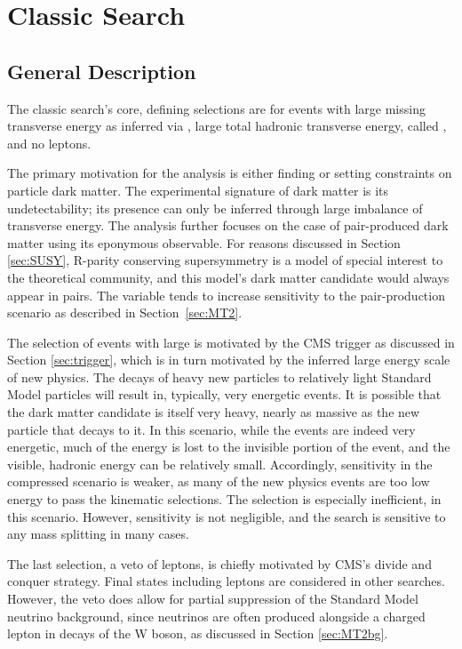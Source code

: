 \section{Classic Search} \label{sec:MT2classic}

  \subsection{General Description} \label{sec:classicdescription}

  The classic search's core, defining selections are for events with large missing transverse energy \met as inferred via \mttwo, large total hadronic transverse energy, called \Ht, and no leptons.

  The primary motivation for the analysis is either finding or setting constraints on particle dark matter.
  The experimental signature of dark matter is its undetectability; its presence can only be inferred through large imbalance of transverse energy.
  The \mttwo analysis further focuses on the case of pair-produced dark matter using its eponymous observable.
  For reasons discussed in Section \ref{sec:SUSY}, R-parity conserving supersymmetry is a model of special interest to the theoretical community, and this model's dark matter candidate would always appear in pairs.
  The \mttwo variable tends to increase sensitivity to the pair-production scenario as described in Section~\ref{sec:MT2}.

  The selection of events with large \Ht is motivated by the CMS trigger as discussed in Section \ref{sec:trigger}, which is in turn motivated by the inferred large energy scale of new physics.
  The decays of heavy new particles to relatively light Standard Model particles will result in, typically, very energetic events.
  It is possible that the dark matter candidate is itself very heavy, nearly as massive as the new particle that decays to it.
  In this scenario, while the events are indeed very energetic, much of the energy is lost to the invisible portion of the event, and the visible, hadronic energy can be relatively small.
  Accordingly, sensitivity in the compressed scenario is weaker, as many of the new physics events are too low energy to pass the kinematic selections.
  The \mttwo selection is especially inefficient, in this scenario.
  However, sensitivity is not negligible, and the search is sensitive to any mass splitting in many cases.
  
  The last selection, a veto of leptons, is chiefly motivated by CMS's divide and conquer strategy.
  Final states including leptons are considered in other searches.
  However, the veto does allow for partial suppression of the Standard Model neutrino background, since neutrinos are often produced alongside a charged lepton in decays of the W boson, as discussed in Section \ref{sec:MT2bg}.

